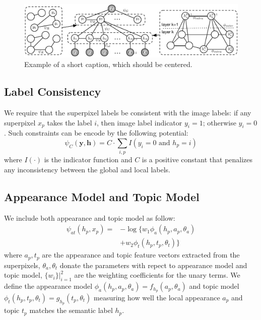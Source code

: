 \begin{figure}
    \begin{center}
        \includegraphics[width=0.95\linewidth]{graphmodel.pdf}
    \end{center}
    \caption{Example of a short caption, which should be centered.}
    \label{fig:graphmodel}
\end{figure}

\subsection{Label Consistency}
We require that the superpixel labels be consistent with the image labels: if any superpixel $x_p$ takes the label $i$, then image label indicator $y_i=1$; otherwise $y_i=0$. Such constraints can be encode by the following potential:
\begin{equation}
    \psi_{C}(\boldsymbol{y},\boldsymbol{h}) = 
    C \cdot \sum_{i,p} I(y_i=0 \mbox{ and } h_p=i) 
\end{equation}
where $I(\cdot)$ is the indicator function and $C$ is a positive constant that penalizes any inconsistency between the global and local labels.

\subsection{Appearance Model and Topic Model}

We include both appearance and topic model as follow:
\begin{equation}
    \begin{aligned}
        \psi_{at}(h_p,x_p) = &- \log \big\{ w_1\phi_a(h_p,a_p,\theta_a) \\
        &+ w_2\phi_t(h_p,t_p,\theta_t) \big\} 
    \end{aligned}
\end{equation}
where $a_p, t_p$ are the appearance and topic feature vectors extracted from the superpixels, $\theta_a, \theta_t$ donate the parameters with repect to appearance model and topic model, $\{w_i\}|_{i=1}^2$ are the weighting coefficients for the unary terms. We define the appearance model $\phi_a(h_p,a_p,\theta_a) = f_{h_p}(a_p,\theta_a)$ and topic model $\phi_t(h_p,t_p,\theta_t) = g_{h_p}(t_p,\theta_t)$ measuring how well the local appearance $a_p$ and topic $t_p$ matches the semantic label $h_p$.

